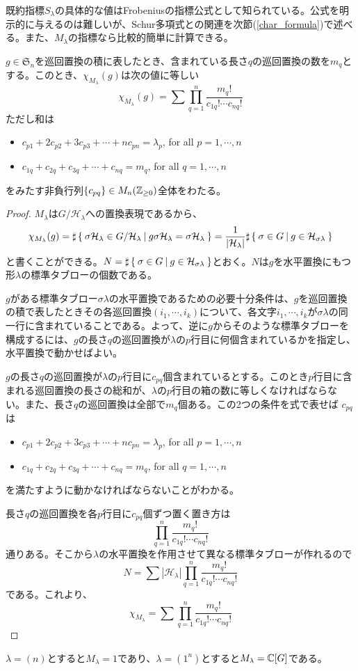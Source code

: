\documentclass{ltjsreport}
\begin{document}
既約指標$S_\lambda$の具体的な値はFrobeniusの指標公式として知られている。公式を明示的に与えるのは難しいが、Schur多項式との関連を次節(\ref{char_formula})で述べる。また、$M_\lambda$の指標なら比較的簡単に計算できる。

\begin{prop}\label{m_lambda_char_1}
  $g\in\mathfrak{S}_n$を巡回置換の積に表したとき、含まれている長さ$q$の巡回置換の数を$m_q$とする。このとき、$\chi_{M_\lambda}(g)$は次の値に等しい
  \[
  \chi_{M_\lambda}(g)=\sum\prod_{q=1}^n\frac{m_q!}{c_{1q}!\cdots c_{nq}!}  
  \]
  ただし和は
  \begin{itemize}
    \item $c_{p1}+2c_{p2}+3c_{p3}+\cdots+nc_{pn}=\lambda_p$, for all $p=1,\cdots,n$
    \item $c_{1q}+c_{2q}+c_{3q}+\cdots+c_{nq}=m_q$, for all $q=1,\cdots,n$
  \end{itemize}
  をみたす非負行列$\{c_{pq}\}\in M_n(\mathbb{Z}_{\geq 0})$全体をわたる。
\end{prop}

\begin{proof}
  $M_\lambda$は$G/\mathcal{H}_\lambda$への置換表現であるから、
  \[
  \chi_{M_\lambda}(g)
  =\sharp\left\{\:\sigma\mathcal{H}_{\lambda}\in G/\mathcal{H}_\lambda\:\middle|\:g\sigma\mathcal{H}_\lambda=\sigma\mathcal{H}_\lambda\:\right\}
  =\frac{1}{|\mathcal{H}_\lambda|}\sharp\left\{\:\sigma\in G\:\middle|\:g\in\mathcal{H}_{\sigma\lambda}\:\right\}
  \]
  と書くことができる。$N=\sharp\left\{\:\sigma\in G\:\middle|\:g\in\mathcal{H}_{\sigma\lambda}\:\right\}$とおく。$N$は$g$を水平置換にもつ形$\lambda$の標準タブローの個数である。
  
  $g$がある標準タブロー$\sigma\lambda$の水平置換であるための必要十分条件は、$g$を巡回置換の積で表したときその各巡回置換$(i_1,\cdots,i_k)$について、各文字$i_1,\cdots,i_k$が$\sigma\lambda$の同一行に含まれていることである。よって、逆に$g$からそのような標準タブローを構成するには、$g$の長さ$q$の巡回置換が$\lambda$の$p$行目に何個含まれているかを指定し、水平置換で動かせばよい。

  $g$の長さ$q$の巡回置換が$\lambda$の$p$行目に$c_{pq}$個含まれているとする。このとき$p$行目に含まれる巡回置換の長さの総和が、$\lambda$の$p$行目の箱の数に等しくなければならない。また、長さ$q$の巡回置換は全部で$m_q$個ある。この2つの条件を式で表せば
  $c_{pq}$は
  \begin{itemize}
    \item $c_{p1}+2c_{p2}+3c_{p3}+\cdots+nc_{pn}=\lambda_p$, for all $p=1,\cdots,n$
    \item $c_{1q}+c_{2q}+c_{3q}+\cdots+c_{nq}=m_q$, for all $q=1,\cdots,n$
  \end{itemize}
  を満たすように動かなければならないことがわかる。

  長さ$q$の巡回置換を各$p$行目に$c_{pq}$個ずつ置く置き方は
  \[
    \prod_{q=1}^n\frac{m_q!}{c_{1q}!\cdots c_{nq}!}    
  \]
  通りある。そこから$\lambda$の水平置換を作用させて異なる標準タブローが作れるので
  \[
  N=\sum|\mathcal{H}_\lambda|\prod_{q=1}^n\frac{m_q!}{c_{1q}!\cdots c_{nq}!}  
  \]
  である。これより、
  \[
  \chi_{M_\lambda}=\sum\prod_{q=1}^n\frac{m_q!}{c_{1q}!\cdots c_{nq}!}   
  \]
\end{proof}

\begin{eg}
  $\lambda=(n)$とすると$M_\lambda=1$であり、$\lambda=(1^n)$とすると$M_\lambda=\mathbb{C}[G]$である。
\end{eg}
\end{document}
